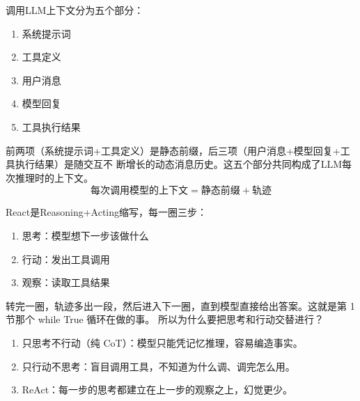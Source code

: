 调用LLM上下文分为五个部分：
\begin{enumerate}
  \item 系统提示词
  \item 工具定义
  \item 用户消息
  \item 模型回复
  \item 工具执行结果
\end{enumerate}
前两项（系统提示词+工具定义）是静态前缀，后三项（用户消息+模型回复+工具执行结果）是随交互不
断增长的动态消息历史。这五个部分共同构成了LLM每次推理时的上下文。\\       
\[\text{每次调用模型的上下文}=\text{静态前缀}+\text{轨迹}\]

\begin{definition}
  React是Reasoning+Acting缩写，每一圈三步：
  \begin{enumerate}
  \item 思考：模型想下一步该做什么
  \item 行动：发出工具调用
  \item 观察：读取工具结果
  \end{enumerate}
\end{definition}

转完一圈，轨迹多出一段，然后进入下一圈，直到模型直接给出答案。这就是第 1 节那个 while True 循环在做的事。
所以为什么要把思考和行动交替进行？
\begin{enumerate}
\item 只思考不行动（纯 CoT）：模型只能凭记忆推理，容易编造事实。
\item 只行动不思考：盲目调用工具，不知道为什么调、调完怎么用。
\item ReAct：每一步的思考都建立在上一步的观察之上，幻觉更少。
\end{enumerate} 

